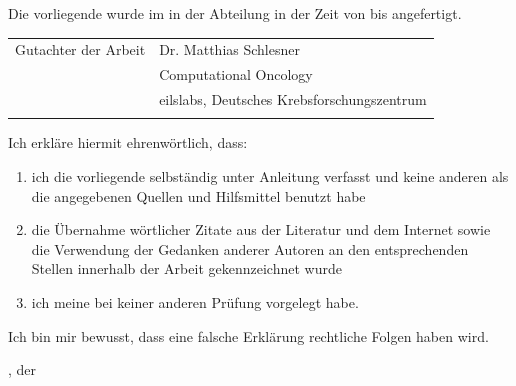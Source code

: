 \cleardoublepage
\thispagestyle{plain}
Die vorliegende \worktype{}  wurde im \institute{} in der Abteilung \department{} in der Zeit von \workstart{} bis \workstop{} angefertigt.

\begin{center}												%
	\begin{tabular}{rl}
		Gutachter der Arbeit 	&Dr. Matthias Schlesner\\
								&Computational Oncology\\
								&eilslabs, Deutsches Krebsforschungszentrum\\
								&\\ %
	\end{tabular}
\end{center}










Ich erkläre hiermit ehrenwörtlich, dass:
\begin{enumerate}
	\item ich die vorliegende \worktype{} selbständig unter Anleitung verfasst und keine anderen als die angegebenen Quellen und Hilfsmittel benutzt habe
	\item die Übernahme wörtlicher Zitate aus der Literatur und dem Internet sowie die Verwendung der Gedanken anderer Autoren an den entsprechenden Stellen innerhalb der Arbeit gekennzeichnet wurde
	\item ich meine \worktype{} bei keiner anderen Prüfung vorgelegt habe.
\end{enumerate}

Ich bin mir bewusst, dass eine falsche Erklärung rechtliche Folgen haben wird. 

\workplace{}, der \workstop{}
\vspace{1,5cm}
\begin{center}
	\begin{minipage}[t]{8cm}
		\centering \dotfill \\
		\workauthor{}
	\end{minipage}
\end{center}


